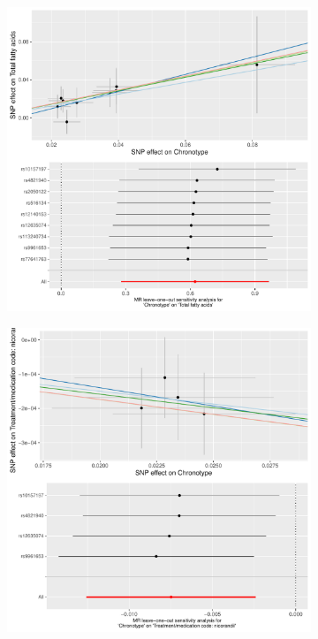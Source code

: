 \documentclass{article}
\begin{document}
\begin{figure}[htbp]
     \centering
     \begin{subfigure}[b]{0.4\textwidth}
         \centering
         \includegraphics[width=\textwidth]{Figs/Analysis2/Chronotype_vs_Total_fatty_acids.Plots.pdf}
         \caption{}
         \label{tffa}
     \end{subfigure}
     \begin{subfigure}[b]{0.4\textwidth}
         \centering
         \includegraphics[width=\textwidth]{Figs/Analysis2/Chronotype_vs_Treatment_medication_code:_nicorandil.Plots.pdf}

\end{subfigure}
\end{figure}
\end{document}
